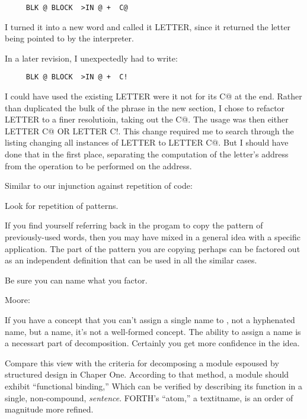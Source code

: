 \begin{verbatim}
     BLK @ BLOCK  >IN @ +  C@
\end{verbatim}
I turned it into a new word and called it LETTER, since it returned the letter being pointed to by the interpreter.

In a later revision, I unexpectedly had to write:

\begin{verbatim}
     BLK @ BLOCK  >IN @ +  C!
\end{verbatim}
I could have used the existing LETTER were it not for its C@ at the end. Rather than duplicated the bulk of the phrase in the new section, I chose to refactor LETTER to a finer resolutioin, taking out the C@. The usage was then either LETTER C@ OR LETTER C!. This change required me to search through the listing changing all instances of LETTER to LETTER C@. But I should have done that in the first place, separating the computation of the letter's address from the operation to be performed on the address.

Similar to our injunction against repetition of code:

\begin{tip}
Look for repetition of patterns.
\end{tip}
If you find yourself referring back in the progam to copy the pattern of previously-used words, then you may have mixed in a general idea with a specific application. The part of the pattern you are copying perhaps can be factored out as an independent definition that can be used in all the similar cases.

\begin{tip}
Be sure you can name what you factor.
\end{tip}

\bigskip
\blackline{2ex}
\noindent Moore:

\begin{tfquot}
If you have a concept that you can't assign a single name to , not a hyphenated name, but a name, it's not a well-formed concept. The ability to assign a name is a necessart part of decomposition. Certainly you get more confidence in the idea.
\end{tfquot}
\blackline{1ex}
Compare this view with the criteria for decomposing a module espoused by structured design in Chaper One. According to that method, a module should exhibit ``functional binding,'' Which can be verified by describing its function in a single, non-compound, \emph{sentence}. FORTH's ``atom,'' a textit{name}, is an order of magnitude more refined.

